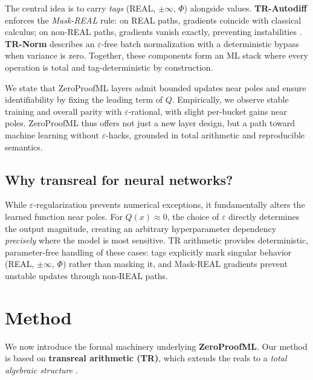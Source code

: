 \documentclass[11pt,twoside]{article}
\begin{document}
The central idea is to carry \emph{tags} (REAL, $\pm\infty$, $\Phi$) alongside values. \textbf{TR-Autodiff} enforces the \emph{Mask-REAL} rule: on REAL paths, gradients coincide with classical calculus; on non-REAL paths, gradients vanish exactly, preventing instabilities \citep{baydin2018autodiff}. \textbf{TR-Norm} describes an $\varepsilon$-free batch normalization with a deterministic bypass when variance is zero. Together, these components form an ML stack where every operation is total and tag-deterministic by construction.

We state that ZeroProofML layers admit bounded updates near poles and ensure identifiability by fixing the leading term of $Q$. Empirically, we observe stable training and overall parity with $\varepsilon$-rational, with slight per-bucket gains near poles. ZeroProofML thus offers not just a new layer design, but a path toward machine learning without $\varepsilon$-hacks, grounded in total arithmetic and reproducible semantics.
\subsection{Why transreal for neural networks?}

While $\varepsilon$-regularization prevents numerical exceptions, it fundamentally alters the learned function near poles. For $Q(x) \approx 0$, the choice of $\varepsilon$ directly determines the output magnitude, creating an arbitrary hyperparameter dependency \emph{precisely} where the model is most sensitive. TR arithmetic provides deterministic, parameter-free handling of these cases: tags explicitly mark singular behavior (REAL, $\pm\infty$, $\Phi$) rather than masking it, and Mask-REAL gradients prevent unstable updates through non-REAL paths.

\section{Method}

We now introduce the formal machinery underlying \textbf{ZeroProofML}. Our method is based on \textbf{transreal arithmetic (TR)}, which extends the reals to a \emph{total algebraic structure} \citep{anderson2019transmathematics}.
\end{document}
